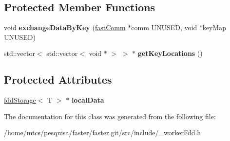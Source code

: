 \subsection*{Protected Member Functions}
\begin{DoxyCompactItemize}
\item 
\hypertarget{classfaster_1_1workerFddCore_a62b8e24206e353c24404145f63f65d12}{}void {\bfseries exchange\+Data\+By\+Key} (\hyperlink{classfaster_1_1fastComm}{fast\+Comm} $\ast$comm U\+N\+U\+S\+E\+D, void $\ast$key\+Map U\+N\+U\+S\+E\+D)\label{classfaster_1_1workerFddCore_a62b8e24206e353c24404145f63f65d12}

\item 
\hypertarget{classfaster_1_1workerFddCore_a8b82124f0cf058974f73df7521a1aa80}{}std\+::vector$<$ std\+::vector$<$ void $\ast$ $>$ $>$ $\ast$ {\bfseries get\+Key\+Locations} ()\label{classfaster_1_1workerFddCore_a8b82124f0cf058974f73df7521a1aa80}

\end{DoxyCompactItemize}
\subsection*{Protected Attributes}
\begin{DoxyCompactItemize}
\item 
\hypertarget{classfaster_1_1workerFddCore_aba24c5db034dd1b8235b9ad4483c5e0e}{}\hyperlink{classfaster_1_1fddStorage}{fdd\+Storage}$<$ T $>$ $\ast$ {\bfseries local\+Data}\label{classfaster_1_1workerFddCore_aba24c5db034dd1b8235b9ad4483c5e0e}

\end{DoxyCompactItemize}


The documentation for this class was generated from the following file\+:\begin{DoxyCompactItemize}
\item 
/home/mtcs/pesquisa/faster/faster.\+git/src/include/\+\_\+worker\+Fdd.\+h\end{DoxyCompactItemize}
